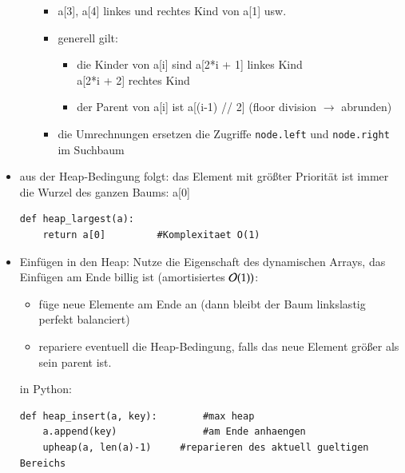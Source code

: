 \begin{itemize}
\begin{itemize}
\begin{itemize}
                \item a[3], a[4] linkes und rechtes Kind von a[1] usw.
                \item generell gilt:
                \begin{itemize}
                    \item die Kinder von a[i] sind a[2*i + 1] linkes Kind \\
                    \hspace*{8cm} a[2*i + 2] rechtes Kind
                    \item der Parent von a[i] ist a[(i-1) // 2] (floor division $\rightarrow$ abrunden)
                \end{itemize}
                \item die Umrechnungen ersetzen die Zugriffe \verb|node.left| und \verb|node.right| im Suchbaum
            \end{itemize}
        \end{itemize}
        \item aus der Heap-Bedingung folgt: das Element mit größter Priorität ist immer die Wurzel des ganzen Baums: a[0]
        \begin{verbatim}
def heap_largest(a):
    return a[0]         #Komplexitaet O(1)
        \end{verbatim}
        \item Einfügen in den Heap: Nutze die Eigenschaft des dynamischen Arrays, das Einfügen am Ende billig ist (amortisiertes $\mathcal{O}{}(1))$:
        \begin{itemize}
            \item füge neue Elemente am Ende an (dann bleibt der Baum linkslastig perfekt balanciert)
            \item repariere eventuell die Heap-Bedingung, falls das neue Element größer als sein parent ist.
        \end{itemize}
        in Python:
        \begin{verbatim}
def heap_insert(a, key):        #max heap
    a.append(key)               #am Ende anhaengen
    upheap(a, len(a)-1)     #reparieren des aktuell gueltigen Bereichs


\end{verbatim}
\end{itemize}
